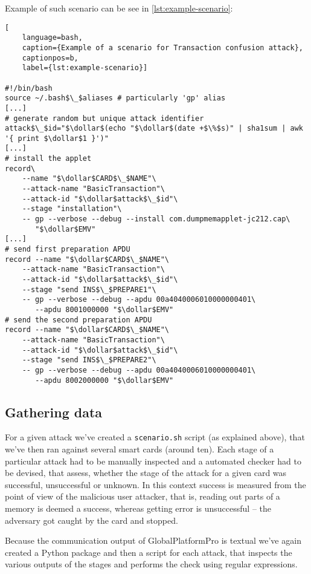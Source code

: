 \documentclass[a4paper]{scrartcl}
\newcommand{\dollar}{\mbox{\textdollar}}
\begin{document}
Example of such scenario can be see in \ref{lst:example-scenario}:
\begin{lstlisting}[
    language=bash,
    caption={Example of a scenario for Transaction confusion attack},
    captionpos=b,
    label={lst:example-scenario}]

#!/bin/bash
source ~/.bash$\_$aliases # particularly 'gp' alias
[...]
# generate random but unique attack identifier
attack$\_$id="$\dollar$(echo "$\dollar$(date +$\%$s)" | sha1sum | awk '{ print $\dollar$1 }')"
[...]
# install the applet
record\
    --name "$\dollar$CARD$\_$NAME"\
    --attack-name "BasicTransaction"\
    --attack-id "$\dollar$attack$\_$id"\
    --stage "installation"\
    -- gp --verbose --debug --install com.dumpmemapplet-jc212.cap\
       "$\dollar$EMV"
[...]
# send first preparation APDU
record --name "$\dollar$CARD$\_$NAME"\
    --attack-name "BasicTransaction"\
    --attack-id "$\dollar$attack$\_$id"\
    --stage "send INS$\_$PREPARE1"\
    -- gp --verbose --debug --apdu 00a4040006010000000401\
       --apdu 8001000000 "$\dollar$EMV"
# send the second preparation APDU
record --name "$\dollar$CARD$\_$NAME"\
    --attack-name "BasicTransaction"\
    --attack-id "$\dollar$attack$\_$id"\
    --stage "send INS$\_$PREPARE2"\
    -- gp --verbose --debug --apdu 00a4040006010000000401\
       --apdu 8002000000 "$\dollar$EMV"
\end{lstlisting}

\subsection{Gathering data}

For a given attack we've created a \texttt{scenario.sh} script (as explained above), that we've then ran against several smart cards (around ten). Each stage of a particular attack had to be manually inspected and a automated checker had to be devised, that assess, whether the stage of the attack for a given card was successful, unsuccessful or unknown. In this context success is measured from the point of view of the malicious user attacker, that is, reading out parts of a memory is deemed a success, whereas getting error is unsuccessful -- the adversary got caught by the card and stopped.

Because the communication output of GlobalPlatformPro is textual we've again created a Python package and then a script for each attack, that inspects the various outputs of the stages and performs the check using regular expressions.
\end{document}
